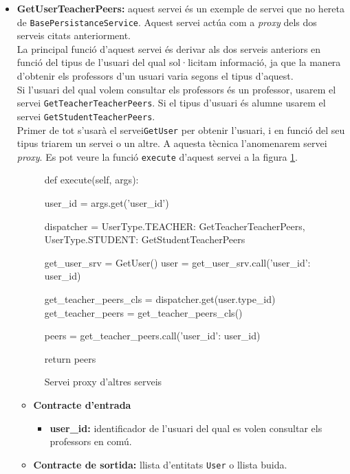 \begin{itemize}
			\item \textbf{GetUserTeacherPeers:} aquest servei és un exemple de servei que no hereta de \texttt{BasePersistanceService}. Aquest servei actúa com a \emph{proxy} dels dos serveis citats anteriorment.\\
			
			 La principal funció d'aquest servei és derivar als dos serveis anteriors en funció del tipus de l'usuari del qual sol·licitam informació,  ja que la manera d'obtenir els professors d'un usuari varia segons el tipus d'aquest. \\
			 
			 Si l'usuari del qual volem consultar els professors és un professor, usarem el servei \texttt{GetTeacherTeacherPeers}. Si el tipus d'usuari és alumne usarem el servei \texttt{GetStudentTeacherPeers}.\\
			 
			  Primer de tot s'usarà el servei\texttt{GetUser} per obtenir l'usuari, i en funció del seu tipus triarem un servei o un altre. A aquesta tècnica l'anomenarem servei \emph{proxy}. Es pot veure la funció \texttt{execute} d'aquest servei a la figura \ref{fig:proxy_srv}.
			
			\begin{figure}[h!]
				\begin{python}
def execute(self, args):
	
	user_id = args.get('user_id')
	
	dispatcher = {
		UserType.TEACHER: GetTeacherTeacherPeers,
		UserType.STUDENT: GetStudentTeacherPeers
	}
	
	get_user_srv = GetUser()
	user = get_user_srv.call({'user_id': user_id})
	
	get_teacher_peers_cls = dispatcher.get(user.type_id)
	get_teacher_peers = get_teacher_peers_cls()
	
	peers = get_teacher_peers.call({'user_id': user_id})
	
	return peers
				\end{python}
				\label{fig:proxy_srv}
				\caption{Servei \ac{proxy} d'altres serveis}
			\end{figure}
			
			\begin{itemize}
					\item \textbf{Contracte d'entrada}
						\begin{itemize}
							\item \textbf{user\_id:} identificador de l'usuari del qual es volen consultar els professors en comú.
						\end{itemize}
					\item \textbf{Contracte de sortida:} llista d'entitats \texttt{User} o llista buida.
				\end{itemize}
				

\end{itemize}
